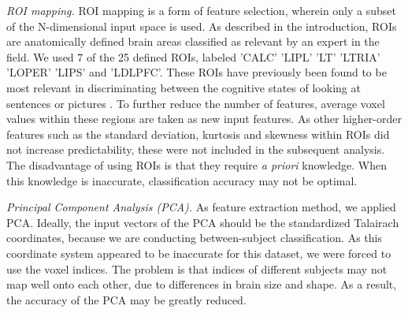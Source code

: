 \documentclass[preprint,journal,11pt]{vgtc}
\begin{document}
\emph{ROI mapping.} ROI mapping is a form of feature selection, wherein only a subset of the N-dimensional input space is used. As described in the introduction, ROIs are anatomically defined brain areas classified as relevant by an expert in the field. We used 7 of the 25 defined ROIs, labeled  'CALC' 'LIPL' 'LT' 'LTRIA' 'LOPER' 'LIPS' and  'LDLPFC'. These ROIs have previously been found to be most relevant in discriminating between the cognitive states of looking at sentences or pictures \cite{wa:2003betw}. To further reduce the number of features, average voxel values within these regions are taken as new input features. As other higher-order features such as the standard deviation, kurtosis and skewness within ROIs did not increase predictability, these were not included in the subsequent analysis. The disadvantage of using ROIs is that they require \textit{a priori} knowledge. When this knowledge is inaccurate, classification accuracy may not be optimal.

\emph{Principal Component Analysis (PCA).} As feature extraction method, we applied PCA. Ideally, the input vectors of the PCA should be the standardized Talairach coordinates, because we are conducting between-subject classification. As this coordinate system appeared to be inaccurate for this dataset, we were forced to use the voxel indices. The problem is that indices of different subjects may not map well onto each other, due to differences in brain size and shape. As a result, the accuracy of the PCA may be greatly reduced.   
\end{document}

